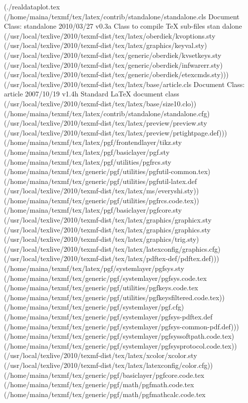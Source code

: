 \begin{center}
\begin{center}
{{(./realdataplot.tex
(/home/maina/texmf/tex/latex/contrib/standalone/standalone.cls
Document Class: standalone 2010/03/27 v0.3a Class to compile TeX sub-files stan
dalone
(/usr/local/texlive/2010/texmf-dist/tex/latex/oberdiek/kvoptions.sty
(/usr/local/texlive/2010/texmf-dist/tex/latex/graphics/keyval.sty)
(/usr/local/texlive/2010/texmf-dist/tex/generic/oberdiek/kvsetkeys.sty
(/usr/local/texlive/2010/texmf-dist/tex/generic/oberdiek/infwarerr.sty)
(/usr/local/texlive/2010/texmf-dist/tex/generic/oberdiek/etexcmds.sty)))
(/usr/local/texlive/2010/texmf-dist/tex/latex/base/article.cls
Document Class: article 2007/10/19 v1.4h Standard LaTeX document class
(/usr/local/texlive/2010/texmf-dist/tex/latex/base/size10.clo))
(/home/maina/texmf/tex/latex/contrib/standalone/standalone.cfg)
(/usr/local/texlive/2010/texmf-dist/tex/latex/preview/preview.sty
(/usr/local/texlive/2010/texmf-dist/tex/latex/preview/prtightpage.def)))
(/home/maina/texmf/tex/latex/pgf/frontendlayer/tikz.sty
(/home/maina/texmf/tex/latex/pgf/basiclayer/pgf.sty
(/home/maina/texmf/tex/latex/pgf/utilities/pgfrcs.sty
(/home/maina/texmf/tex/generic/pgf/utilities/pgfutil-common.tex)
(/home/maina/texmf/tex/generic/pgf/utilities/pgfutil-latex.def
(/usr/local/texlive/2010/texmf-dist/tex/latex/ms/everyshi.sty))
(/home/maina/texmf/tex/generic/pgf/utilities/pgfrcs.code.tex))
(/home/maina/texmf/tex/latex/pgf/basiclayer/pgfcore.sty
(/usr/local/texlive/2010/texmf-dist/tex/latex/graphics/graphicx.sty
(/usr/local/texlive/2010/texmf-dist/tex/latex/graphics/graphics.sty
(/usr/local/texlive/2010/texmf-dist/tex/latex/graphics/trig.sty)
(/usr/local/texlive/2010/texmf-dist/tex/latex/latexconfig/graphics.cfg)
(/usr/local/texlive/2010/texmf-dist/tex/latex/pdftex-def/pdftex.def)))
(/home/maina/texmf/tex/latex/pgf/systemlayer/pgfsys.sty
(/home/maina/texmf/tex/generic/pgf/systemlayer/pgfsys.code.tex
(/home/maina/texmf/tex/generic/pgf/utilities/pgfkeys.code.tex
(/home/maina/texmf/tex/generic/pgf/utilities/pgfkeysfiltered.code.tex))
(/home/maina/texmf/tex/generic/pgf/systemlayer/pgf.cfg)
(/home/maina/texmf/tex/generic/pgf/systemlayer/pgfsys-pdftex.def
(/home/maina/texmf/tex/generic/pgf/systemlayer/pgfsys-common-pdf.def)))
(/home/maina/texmf/tex/generic/pgf/systemlayer/pgfsyssoftpath.code.tex)
(/home/maina/texmf/tex/generic/pgf/systemlayer/pgfsysprotocol.code.tex))
(/usr/local/texlive/2010/texmf-dist/tex/latex/xcolor/xcolor.sty
(/usr/local/texlive/2010/texmf-dist/tex/latex/latexconfig/color.cfg))
(/home/maina/texmf/tex/generic/pgf/basiclayer/pgfcore.code.tex
(/home/maina/texmf/tex/generic/pgf/math/pgfmath.code.tex
(/home/maina/texmf/tex/generic/pgf/math/pgfmathcalc.code.tex
}}
\end{center}
\end{center}
